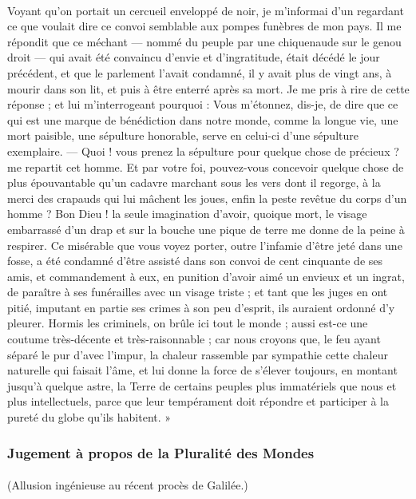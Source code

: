 \documentclass[a4paper, 11pt, oneside]{article}
\begin{document}
\paragraph{}
Voyant qu'on portait un cercueil enveloppé de noir, je m'informai d'un regardant ce que voulait dire ce convoi semblable aux pompes funèbres de mon pays. Il me répondit que ce méchant --- nommé du peuple par une chiquenaude sur le genou droit --- qui avait été convaincu d'envie et d'ingratitude, était décédé le jour précédent, et que le parlement l'avait condamné, il y avait plus de vingt ans, à mourir dans son lit, et puis à être enterré après sa mort. Je me pris à rire de cette réponse ; et lui m'interrogeant pourquoi : Vous m'étonnez, dis-je, de dire que ce qui est une marque de bénédiction dans notre monde, comme la longue vie, une mort paisible, une sépulture honorable, serve en celui-ci d'une sépulture exemplaire. --- Quoi ! vous prenez la sépulture pour quelque chose de précieux ? me repartit cet homme. Et par votre foi, pouvez-vous concevoir quelque chose de plus épouvantable qu'un cadavre marchant sous les vers dont il regorge, à la merci des crapauds qui lui mâchent les joues, enfin la peste revêtue du corps d'un homme ? Bon Dieu ! la seule imagination d'avoir, quoique mort, le visage embarrassé d'un drap et sur la bouche une pique de terre me donne de la peine à respirer. Ce misérable que vous voyez porter, outre l'infamie d'être jeté dans une fosse, a été condamné d'être assisté dans son convoi de cent cinquante de ses amis, et commandement à eux, en punition d'avoir aimé un envieux et un ingrat, de paraître à ses funérailles avec un visage triste ; et tant que les juges en ont pitié, imputant en partie ses crimes à son peu d'esprit, ils auraient ordonné d'y pleurer. Hormis les criminels, on brûle ici tout le monde ; aussi est-ce une coutume très-décente et très-raisonnable ; car nous croyons que, le feu ayant séparé le pur d'avec l'impur, la chaleur rassemble par sympathie cette chaleur naturelle qui faisait l'âme, et lui donne la force de s'élever toujours, en montant jusqu'à quelque astre, la Terre de certains peuples plus immatériels que nous et plus intellectuels, parce que leur tempérament doit répondre et participer à la pureté du globe qu'ils habitent. »

\subsubsection{Jugement à propos de la Pluralité des Mondes}
\paragraph{}
(Allusion ingénieuse au récent procès de Galilée.)
\end{document}
